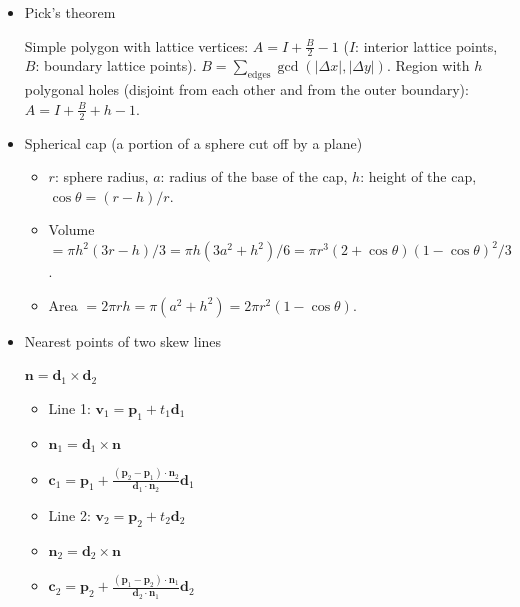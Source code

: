 \begin{itemize}
\item Pick's theorem

Simple polygon with lattice vertices: $A = I + \frac{B}{2} - 1$ ($I$: interior lattice points, $B$: boundary lattice points). $B = \sum_{\text{edges}} \gcd(|\Delta x|, |\Delta y|)$. Region with $h$ polygonal holes (disjoint from each other and from the outer boundary): $A = I + \frac{B}{2} + h - 1$.

\item Spherical cap (a portion of a sphere cut off by a plane)

\begin{itemize}
  \item $r$: sphere radius, $a$: radius of the base of the cap, $h$: height of the cap, $\cos\theta = (r-h)/r$.
  \item Volume $=\pi h^2(3r-h)/3=\pi h(3a^2+h^2)/6=\pi r^3(2+\cos\theta)(1-\cos\theta)^2/3$.
  \item Area $=2\pi rh=\pi(a^2+h^2)=2\pi r^2(1-\cos\theta)$.
\end{itemize}

\item Nearest points of two skew lines

$\boldsymbol{n} = \boldsymbol{d}_1 \times \boldsymbol{d}_2$

\noindent
\begin{minipage}[t]{0.47\linewidth}
\begin{itemize}
  \item Line 1: $\boldsymbol{v}_1 = \boldsymbol{p}_1 + t_1\boldsymbol{d}_1$
  \item $\boldsymbol{n}_1 = \boldsymbol{d}_1 \times \boldsymbol{n}$
  \item $\boldsymbol{c}_1 = \boldsymbol{p}_1 + \frac{(\boldsymbol{p}_2 - \boldsymbol{p}_1)\cdot\boldsymbol{n}_2}{\boldsymbol{d}_1\cdot\boldsymbol{n}_2}\boldsymbol{d}_1$
\end{itemize}
\end{minipage}\hfill
\begin{minipage}[t]{0.47\linewidth}
\begin{itemize}
  \item Line 2: $\boldsymbol{v}_2 = \boldsymbol{p}_2 + t_2\boldsymbol{d}_2$
  \item $\boldsymbol{n}_2 = \boldsymbol{d}_2 \times \boldsymbol{n}$
  \item $\boldsymbol{c}_2 = \boldsymbol{p}_2 + \frac{(\boldsymbol{p}_1 - \boldsymbol{p}_2)\cdot\boldsymbol{n}_1}{\boldsymbol{d}_2\cdot\boldsymbol{n}_1}\boldsymbol{d}_2$
\end{itemize}
\end{minipage}


\end{itemize}
